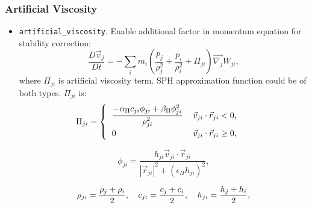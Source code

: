 \subsubsection{Artificial Viscosity}
\begin{itemize}
    \item \verb|artificial_viscosity|. Enable additional factor in momentum equation for stability correction:
    \begin{equation}
        \frac{D\vec{v}_j}{D t} = 
        -\sum\limits_{i} m_{i} 
        \left(
        \frac{p_{j}}{\rho_{j}^{2}} + 
        \frac{p_{i}}{\rho_{i}^{2}} +
        \Pi_{ji}
        \right) \vec{\nabla_{j}} W_{ji},
    \end{equation}
    where $\Pi_{ji}$ is artificial viscosity term. SPH approximation function could be of both types.
    $\Pi_{ji}$ is:
    \begin{equation}\label{eq:artvisc}
        \Pi_{ji} = 
        \begin{cases}
          \begin{tabular}{l l}
              $\displaystyle{
              \frac{-\alpha_{\Pi}c_{ji}\phi_{ji} + \beta_{\Pi}\phi_{ji}^{2}}{\rho_{ji}^{2}}
              }$
              &
              $\vec{v}_{ji} \cdot \vec{r}_{ji} < 0$, 
              
              \\
              
              0
              &
              $\vec{v}_{ji} \cdot \vec{r}_{ji} \geq 0$,
          \end{tabular}  
        \end{cases} 
    \end{equation}

    \begin{equation}
        \phi_{ji} = 
        \frac
        {h_{ji}\vec{v}_{ji} \cdot \vec{r}_{ji}}
        {|\vec{r}_{ji}|^2 + (\epsilon_{\Pi} h_{ji})^2 },
    \end{equation}

    \begin{equation}
        \begin{tabular}{l l l}
              $\displaystyle{
              \rho_{ji} = \frac{\rho_{j} + \rho_{i}}{2}
              }$,
              &
              $\displaystyle{
              c_{ji} = \frac{c_{j} + c_{i}}{2}
              }$, 
              &
              $\displaystyle{
              h_{ji} = \frac{h_{j} + h_{i}}{2}
              }$,
          \end{tabular}  
    \end{equation}
    

\end{itemize}
